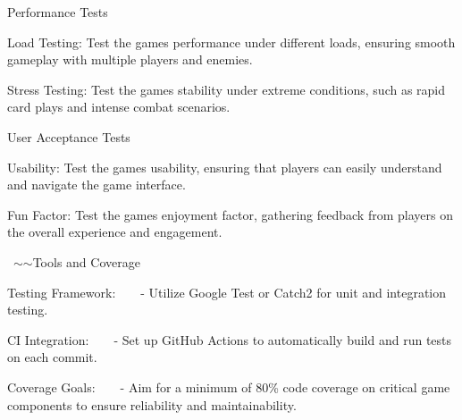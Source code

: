 \begin{DoxyEnumerate}
\item Performance Tests
\begin{DoxyItemize}
\item Load Testing\+: Test the game\textquotesingle{}s performance under different loads, ensuring smooth gameplay with multiple players and enemies.
\item Stress Testing\+: Test the game\textquotesingle{}s stability under extreme conditions, such as rapid card plays and intense combat scenarios.
\end{DoxyItemize}
\item User Acceptance Tests
\begin{DoxyItemize}
\item Usability\+: Test the game\textquotesingle{}s usability, ensuring that players can easily understand and navigate the game interface.
\item Fun Factor\+: Test the game\textquotesingle{}s enjoyment factor, gathering feedback from players on the overall experience and engagement.\+ 
\end{DoxyItemize}
\end{DoxyEnumerate}

 \texorpdfstring{$\sim$}{\string~}\texorpdfstring{$\sim$}{\string~}\+Tools and Coverage
\begin{DoxyItemize}
\item Testing Framework\+:     -\/ Utilize Google Test or Catch2 for unit and integration testing.
\item CI Integration\+:     -\/ Set up Git\+Hub Actions to automatically build and run tests on each commit.
\item Coverage Goals\+:     -\/ Aim for a minimum of 80\% code coverage on critical game components to ensure reliability and maintainability. 
\end{DoxyItemize}